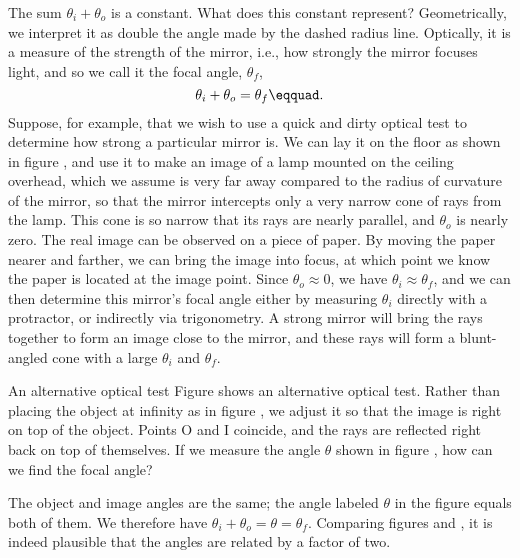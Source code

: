The sum $\theta_i+\theta_o$ is a constant. What does this
constant represent? Geometrically, we interpret it as double
the angle made by the dashed radius line. Optically, it is a
measure of the strength of the mirror, i.e., how strongly
the mirror focuses light, and so we call it the focal
angle, $\theta_f$,
\begin{equation*}
                \theta_i+\theta_o  =  \theta_f\eqquad.
\end{equation*}
Suppose, for example, that we wish to use a quick and dirty
optical test to determine how strong a particular mirror is.
We can lay it on the floor as shown in figure , and use
it to make an image of a lamp mounted on the ceiling
overhead, which we assume is very far away compared to the
radius of curvature of the mirror, so that the mirror
intercepts only a very narrow cone of rays from the lamp.
This cone is so narrow that its rays are nearly parallel,
and $\theta_o$ is nearly zero. The real image can be
observed on a piece of paper. By moving the paper nearer and
farther, we can bring the image into focus, at which point
we know the paper is located at the image point. Since
$\theta_o\approx 0$, we have $\theta_i\approx \theta_f$, and we can
then determine this mirror's focal angle either by measuring
$\theta_i$ directly with a protractor, or indirectly via
trigonometry. A strong mirror will bring the rays together to form
an image close to the mirror, and these rays will form a
blunt-angled cone with a large $\theta_i$ and $\theta_f$.

\begin{eg}{An alternative optical test}\label{eg:focal-angle-alternative}
\egquestion Figure  shows an alternative optical test. Rather
than placing the object at infinity as in figure , we
adjust it so that the image is right on top of the object.
Points O and I coincide, and the rays are reflected right
back on top of themselves. If we measure the angle $\theta $
shown in figure , how can we find the focal angle?

\eganswer The object and image angles are the same; the
angle labeled $\theta $ in the figure equals both of them.
We therefore have $\theta_i+\theta_o=\theta =\theta_f$.
Comparing figures  and , it is indeed plausible that
the angles are related by a factor of two.
\end{eg}

